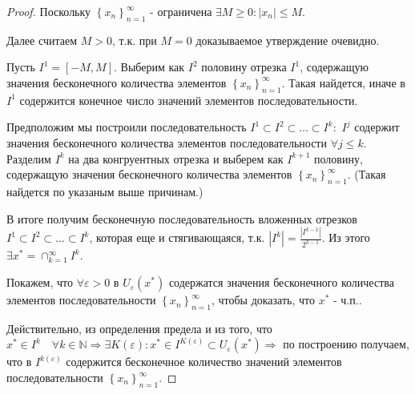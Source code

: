 \documentclass[a5paper, 10pt]{article}
\theoremstyle{plain}
\newcommand{\N}{\mathbb N}
\newcommand{\eps}{\varepsilon}
\newcommand{\Rarrow}{\Rightarrow}
\begin{document}
    \begin{proof}
        Поскольку $ \left\{x_n \right\}_{n = 1}^{\infty} $ - ограничена
        $ \exists M \geq 0: | x_n | \leq M $.

        Далее считаем $ M > 0 $, т.к. при $ M = 0 $ доказываемое утверждение очевидно.

        Пусть $ I^1 = \left[ -M, M \right] $.
        Выберим как $ I^2 $ половину отрезка $ I^1 $, содержащую значения бесконечного
        количества элементов $ \left\{x_n \right\}_{n = 1}^{\infty} $. Такая найдется,
        иначе в $ I^1 $ содержится конечное число значений элементов последовательности.

        Предположим мы построили последовательность $ I^1 \subset I^2 \subset \dots \subset I^k: $
        $ I^j $ содержит значения бесконечного количества элементов последовательности
        $ \forall j \leq k $.
        Разделим $ I^k $ на два конгруентных отрезка и выберем как $ I^{k+1} $ половину,
        содержащую значения бесконечного количества элементов
        $ \left\{x_n \right\}_{n = 1}^{\infty} $. (Такая найдется по указаным выше причинам.)

        В итоге получим бесконечную последовательность вложенных отрезков
        $ I^1 \subset I^2 \subset \dots \subset I^k $, которая еще и стягивающаяся, т.к.
        $ \left| I^k \right| = \frac{|I^{k - 1}|}{2^{k-1}} $. Из этого
        $ \exists x^* = \cap_{k=1}^\infty I^k $.

        Покажем, что $ \forall \eps > 0 $ в $ U_{\eps}(x^*) $ содержатся значения
        бесконечного количества элементов последовательности
        $ \left\{x_n \right\}_{n = 1}^{\infty} $,
        чтобы доказать, что
        $ x^* $ - ч.п..

        Действительно, из определения предела и из того, что
        $ x^* \in I^k \quad \forall k \in \N \Rarrow
        \exists K(\eps): x^* \in I^{K(\eps)} \subset U_{\eps}(x^*) \Rarrow $
        по построению получаем, что в $ I^{k(\eps)} $ содержится бесконечное количество
        значений элементов последовательности $ \left\{x_n \right\}_{n = 1}^{\infty} $.
    \end{proof}
\end{document}

